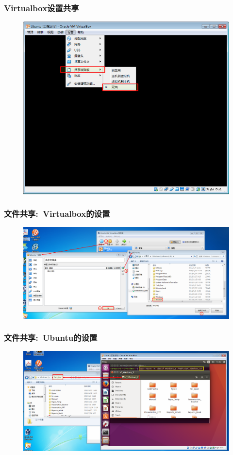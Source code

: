 \frame
{
	\frametitle{\textrm{Virtualbox}设置共享}
\begin{figure}[h!]
\centering
\vspace{2.5pt}
\includegraphics[height=0.62\textwidth]{Figures/Virtualbox-add-2.png}
\label{Virtualbox-add-2}
\end{figure}
}

\frame
{
	\frametitle{文件共享:~\textrm{Virtualbox}的设置}
\begin{figure}[h!]
\centering
\vspace{17.5pt}
\includegraphics[height=0.44\textwidth]{Figures/Virtualbox-add.png}
\label{Virtualbox-add}
\end{figure}
}

\frame
{
	\frametitle{文件共享:~\textrm{Ubuntu}的设置}
\begin{figure}[h!]
\centering
\vspace{17.5pt}
\includegraphics[height=0.47\textwidth]{Figures/Virtualbox-add-8.png}
\label{Virtualbox-add-8}
\end{figure}
}

